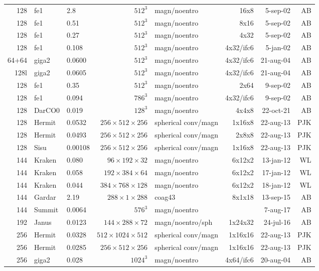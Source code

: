 \documentclass[\mydriver,12pt,twoside,notitlepage,a4paper]{article}
\begin{document}
\begin{center}
\begin{footnotesize}
\begin{longtable}{rllrlrrr}
 128 & fe1   & 2.8  & $512^3$ & magn/noentro & 16x8   &  5-sep-02 & AB \\
 128 & fe1   & 0.51 & $512^3$ & magn/noentro & 8x16   &  5-sep-02 & AB \\
 128 & fe1   & 0.27 & $512^3$ & magn/noentro & 4x32   &  5-sep-02 & AB \\
 128 & fe1   & 0.108& $512^3$ & magn/noentro &4x32/ifc6& 5-jan-02 & AB \\
64+64& giga2 & 0.0600&$512^3$ & magn/noentro &4x32/ifc6&21-aug-04 & AB \\
 128l& giga2 & 0.0605&$512^3$ & magn/noentro &4x32/ifc6&21-aug-04 & AB \\
 128 & fe1   & 0.35 & $512^3$ & magn/noentro & 2x64   &  9-sep-02 & AB \\
 128 & fe1   & 0.094& $786^3$ & magn/noentro &4x32/ifc6& 9-sep-02 & AB \\
 128 & DarCO0& 0.019& $128^3$ & magn/noentro &4x4x8   & 22-oct-21 & AB \\
 128 &Hermit&0.0532&$256{\!\times\!}512{\!\times\!}256$&spherical conv/magn&1x16x8&22-aug-13&PJK\\
 128 &Hermit&0.0493&$256{\!\times\!}512{\!\times\!}256$&spherical conv/magn&2x8x8&22-aug-13&PJK\\
 128 & Sisu  & 0.00108&$256{\!\times\!}512{\!\times\!}256$&spherical conv/magn&1x16x8&22-aug-13&PJK\\
 144 & Kraken& 0.080  &$96{\!\times\!}192{\!\times\!}32$ & magn/noentro & 6x12x2 &13-jan-12 & WL\\
 144 & Kraken& 0.058  &$192{\!\times\!}384{\!\times\!}64$ & magn/noentro & 6x12x2 &17-jan-12 & WL\\
 144 & Kraken& 0.044  &$384{\!\times\!}768{\!\times\!}128$ & magn/noentro & 6x12x2 &18-jan-12 & WL\\
 144 & Gardar& 2.19&  $288{\!\times\!}1{\!\times\!}288$ & coag43&8x1x18 & 13-sep-15& AB \\
 144 &Summit &0.0064& $576^3$ & magn/noentro &        &  7-aug-17 & AB \\
 192 &Janus&0.0123&$144{\!\times\!}288{\!\times\!}72$&magn/noentro/sph&1x24x32& 24-jul-16 & AB \\
 256 &Hermit&0.0328&$512{\!\times\!}1024{\!\times\!}512$&spherical conv/magn&1x16x16&22-aug-13&PJK\\
 256 &Hermit&0.0285&$256{\!\times\!}512{\!\times\!}256$&spherical conv/magn&1x16x16&22-aug-13&PJK\\
 256 & giga2 & 0.028& $1024^3$& magn/noentro &4x64/ifc6&20-aug-04 & AB \\

\end{longtable}
\end{footnotesize}
\end{center}
\end{document}
